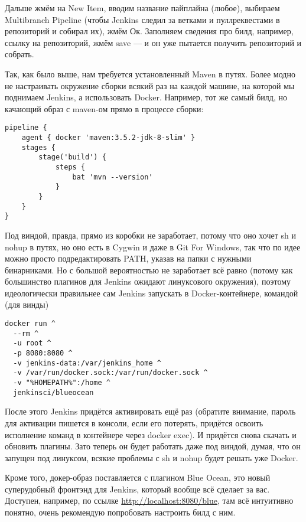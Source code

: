 \documentclass[a5paper]{article}
\begin{document}
Дальше жмём на New Item, вводим название пайплайна (любое), выбираем Multibranch Pipeline (чтобы Jenkins следил за ветками и пуллреквестами в репозиторий и собирал их), жмём Ок. Заполняем сведения про билд, например, ссылку на репозиторий, жмём save --- и он уже пытается получить репозиторий и собрать. 

Так, как было выше, нам требуется установленный Maven в путях. Более модно не настраивать окружение сборки всякий раз на каждой машине, на которой мы поднимаем Jenkins, а использовать Docker. Например, тот же самый билд, но качающий образ с maven-ом прямо в процессе сборки:

\begin{verbatim}
pipeline {
    agent { docker 'maven:3.5.2-jdk-8-slim' }
    stages {
        stage('build') {
            steps {
                bat 'mvn --version'
            }
        }
    }
}
\end{verbatim}

Под виндой, правда, прямо из коробки не заработает, потому что оно хочет sh и nohup в путях, но оно есть в Cygwin и даже в Git For Windows, так что по идее можно просто подредактировать PATH, указав на папки с нужными бинарниками. Но с большой вероятностью не заработает всё равно (потому как большинство плагинов для Jenkins ожидают линуксового окружения), поэтому идеологически правильнее сам Jenkins запускать в Docker-контейнере, командой (для винды)

\begin{verbatim}
docker run ^
  --rm ^
  -u root ^
  -p 8080:8080 ^
  -v jenkins-data:/var/jenkins_home ^
  -v /var/run/docker.sock:/var/run/docker.sock ^
  -v "%HOMEPATH%":/home ^
  jenkinsci/blueocean
\end{verbatim}

После этого Jenkins придётся активировать ещё раз (обратите внимание, пароль для активации пишется в консоли, если его потерять, придётся освоить исполнение команд в контейнере через docker exec). И придётся снова скачать и обновить плагины. Зато теперь он будет работать даже под виндой, думая, что он запущен под линуксом, всякие проблемы с sh и nohup будет решать уже Docker.

Кроме того, докер-образ поставляется с плагином Blue Ocean, это новый суперудобный фронтэнд для Jenkins, который вообще всё сделает за вас. Доступен, например, по ссылке \url{http://localhost:8080/blue}, там всё интуитивно понятно, очень рекомендую попробовать настроить билд с ним.
\end{document}
